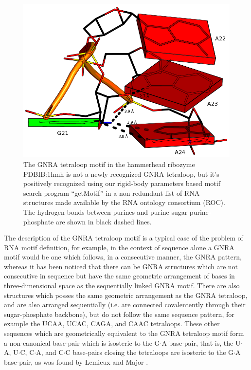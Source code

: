 \begin{figure}
\centering
\includegraphics[angle=0, scale=0.8]{Chapter5/gnra21L2.png}
\caption{The   GNRA  tetraloop  motif   in  the   hammerhead  ribozyme
  PDBIB:1hmh \cite{pley1994} is not a newly recognized GNRA tetraloop,
  but it's positively recognized using our rigid-body parameters based
  motif  search program ``getMotif''  in a  non-redundant list  of RNA
  structures made available by the RNA ontology consortium (ROC).  The
  hydrogen bonds between purines and purine-sugar purine-phosphate are
  shown in black dashed lines.}
\label{fig:gnrablocks}
\end{figure}

The description of  the GNRA tetraloop motif is a  typical case of the
problem  of RNA  motif  definition,  for example,  in  the context  of
sequence  alone  a  GNRA  motif  would  be one  which  follows,  in  a
consecutive manner, the GNRA pattern, whereas it has been noticed that
there can be GNRA structures which are not consecutive in sequence but
have  the same  geometric  arrangement of  bases in  three-dimensional
space  as  the  sequentially   linked  GNRA  motif.   There  are  also
structures  which posses the  same geometric  arrangement as  the GNRA
tetraloop, and are also arranged sequentially (i.e.  are connected
covalentently  through  their sugar-phosphate  backbone),  but do  not
follow the  same sequence pattern,  for example the UCAA,  UCAC, CAGA,
and  CAAC tetraloops\cite{lemieux2006}.   These other  sequences which
are  geometrically  equivalent to  the  GNRA  tetraloop  motif form  a
non-canonical base-pair which is isosteric to the G$\cdot$A base-pair,
that is, the U$\cdot$A, U$\cdot$C, C$\cdot$A, and C$\cdot$C base-pairs
closing the  tetraloops are isosteric  to the G$\cdot$A  base-pair, as
was found by Lemieux and Major \cite{lemieux2006}.

